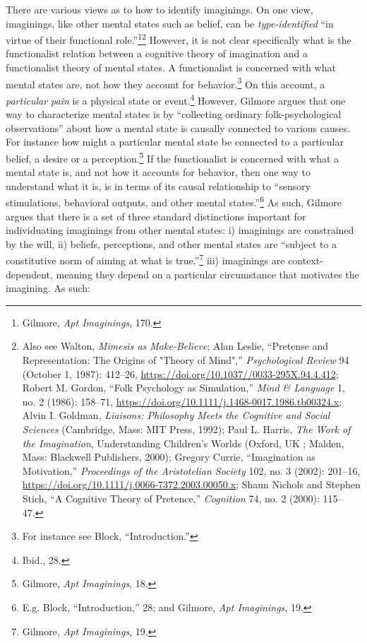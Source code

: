 \documentclass[phdthesis,12pt,final,a4paper]{wuthesis}
\theoremstyle{definition}
\theoremstyle{definition}
\theoremstyle{definition}
\theoremstyle{definition}
\theoremstyle{remark}
\begin{document}
There are various views as to how to identify imaginings. On one view, imaginings, like other mental states such as belief, can be \emph{type-identified} ``in virtue of their functional role.''\footnote{Gilmore, \emph{Apt {Imaginings}}, 170.}\footnote{Also see Walton, \emph{Mimesis as {Make-Believe}}; Alan Leslie, {``Pretense and {Representation}: {The Origins} of "{Theory} of {Mind}",''} \emph{Psychological Review} 94 (October 1, 1987): 412--26, \url{https://doi.org/10.1037//0033-295X.94.4.412}; Robert M. Gordon, {``Folk Psychology as Simulation,''} \emph{Mind \& Language} 1, no. 2 (1986): 158--71, \url{https://doi.org/10.1111/j.1468-0017.1986.tb00324.x}; Alvin I. Goldman, \emph{Liaisons: Philosophy Meets the Cognitive and Social Sciences} (Cambridge, Mass: MIT Press, 1992); Paul L. Harris, \emph{The {Work} of the {Imagination}}, Understanding {Children}'s {Worlds} (Oxford, UK ; Malden, Mass: Blackwell Publishers, 2000); Gregory Currie, {``Imagination as Motivation,''} \emph{Proceedings of the Aristotelian Society} 102, no. 3 (2002): 201--16, \url{https://doi.org/10.1111/j.0066-7372.2003.00050.x}; Shaun Nichols and Stephen Stich, {``A {Cognitive Theory} of {Pretence},''} \emph{Cognition} 74, no. 2 (2000): 115--47.} However, it is not clear specifically what is the functionalist relation between a cognitive theory of imagination and a functionalist theory of mental states. A functionalist is concerned with what mental states are, not how they account for behavior.\footnote{For instance see Block, {``Introduction.''}} On this account, a \emph{particular pain} is a physical state or event.\footnote{Ibid., 28.} However, Gilmore argues that one way to characterize mental states is by ``collecting ordinary folk-psychological observations'' about how a mental state is causally connected to various causes. For instance how might a particular mental state be connected to a particular belief, a desire or a perception.\footnote{Gilmore, \emph{Apt {Imaginings}}, 18.} If the functionalist is concerned with what a mental state is, and not how it accounts for behavior, then one way to understand what it is, is in terms of its causal relationship to ``sensory stimulations, behavioral outputs, and other mental states.''\footnote{E.g. Block, {``Introduction,''} 28; and Gilmore, \emph{Apt {Imaginings}}, 19.} As such, Gilmore argues that there is a set of three standard distinctions important for individuating imaginings from other mental states: i) imaginings are constrained by the will, ii) beliefs, perceptions, and other mental states are ``subject to a constitutive norm of aiming at what is true.''\footnote{Gilmore, \emph{Apt {Imaginings}}, 19.} iii) imaginings are context-dependent, meaning they depend on a particular circumstance that motivates the imagining. As such:
\end{document}
